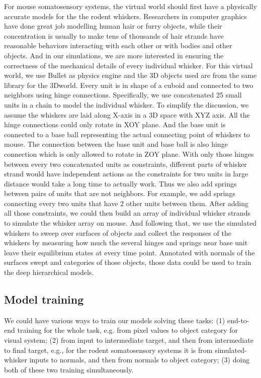 \documentclass[12pt]{article}
\begin{document}
For mouse somatosensory systems, the virtual world should first have a physically accurate models for the the rodent whiskers.
Researchers in computer graphics have done great job modelling human hair or furry objects\cite{Hadap2008, Ward2007}, while their concentration is usually to make tens of thousands of hair strands have reasonable behaviors interacting with each other or with bodies and other objects.
And in our simulations, we are more interested in ensuring the correctness of the mechanical details of every individual whisker. For this virtual world, we use Bullet \cite{wiki:bullet} as physics engine and the 3D objects used are from the same library for the 3Dworld. Every unit is in shape of a cuboid and connected to two neighbors using hinge connections.
Specifically, we use concatenated 25 small units in a chain to model the individual whisker.
To simplify the discussion, we assume the whiskers are laid along X-axis in a 3D space with XYZ axis. All the hinge connections could only rotate in XOY plane. And the base unit is connected to a base ball representing the actual connecting point of whiskers to mouse. The connection between the base unit and base ball is also hinge connection which is only allowed to rotate in ZOY plane.
With only those hinges between every two concatenated units as constraints, different parts of whisker strand would have independent actions as the constraints for two units in large distance would take a long time to actually work. Thus we also add springs between pairs of units that are not neighbors. For example, we add springs connecting every two units that have 2 other units between them.
After adding all those constraints, we could then build an array of individual whisker strands to simulate the whisker array on mouse. And following that, we use the simulated whiskers to sweep over surfaces of objects and collect the responses of the whiskers by measuring how much the several hinges and springs near base unit leave their equilibrium states at every time point. Annotated with normals of the surfaces swept and categories of those objects, those data could be used to train the deep hierarchical models.

\subsection*{Model training}

We could have various ways to train our models solving these tasks: (1) end-to-end training for the whole task, e.g. from pixel values to object category for visual system; (2) from input to intermediate target, and then from intermediate to final target, e.g., for the rodent somatosensory systems it is from simulated-whisker inputs to normals, and then from normals to object category; (3) doing both of these two training simultaneously.
\end{document}
